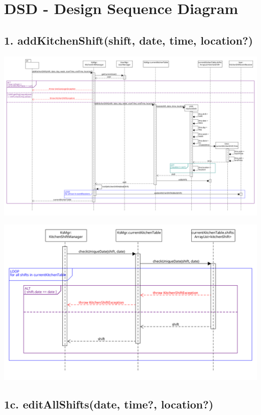\chapter{DSD - Design Sequence Diagram}

\section*{1. addKitchenShift(shift, date, time, location?)}

\begin{center}
  \includegraphics[scale = 0.2]{images/DSD/Esame DSD 1.png}
\end{center}

\begin{center}
  \includegraphics[scale = 0.4]{images/DSD/Esame DSD 1 Extra.png}  
\end{center}

\pagebreak

\section*{1c. editAllShifts(date, time?, location?)}

